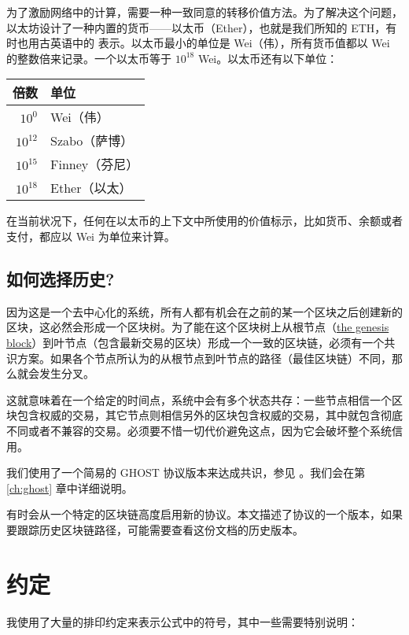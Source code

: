 \documentclass[9pt,oneside]{amsart}
\begin{document}
\begin{multicols}{2}
为了激励网络中的计算，需要一种一致同意的转移价值方法。为了解决这个问题，以太坊设计了一种内置的货币——以太币（Ether），也就是我们所知的 {\small ETH}，有时也用古英语中的 \DH{} 表示。以太币最小的单位是 Wei（伟），所有货币值都以 Wei 的整数倍来记录。一个以太币等于 $10^{18}$ Wei。以太币还有以下单位：
\par
\begin{center}
\begin{tabular}{rl}
\toprule
倍数 & 单位 \\
\midrule
$10^0$ & Wei（伟） \\
$10^{12}$ & Szabo（萨博） \\
$10^{15}$ & Finney（芬尼） \\
$10^{18}$ & Ether（以太） \\
\bottomrule
\end{tabular}
\end{center}
\par

在当前状况下，任何在以太币的上下文中所使用的价值标示，比如货币、余额或者支付，都应以 Wei 为单位来计算。

\subsection{如何选择历史?}

因为这是一个去中心化的系统，所有人都有机会在之前的某一个区块之后创建新的区块，这必然会形成一个区块树。为了能在这个区块树上从根节点（\hyperlink{Genesis_Block}{the genesis block}）到叶节点（包含最新交易的区块）形成一个一致的区块链，必须有一个共识方案。如果各个节点所认为的从根节点到叶节点的路径（最佳区块链）不同，那么就会发生分叉。

这就意味着在一个给定的时间点，系统中会有多个状态共存：一些节点相信一个区块包含权威的交易，其它节点则相信另外的区块包含权威的交易，其中就包含彻底不同或者不兼容的交易。必须要不惜一切代价避免这点，因为它会破坏整个系统信用。

我们使用了一个简易的 GHOST 协议版本来达成共识，参见 \cite{cryptoeprint:2013:881}。我们会在第 \ref{ch:ghost} 章中详细说明。

有时会从一个特定的区块链高度启用新的协议。本文描述了协议的一个版本，如果要跟踪历史区块链路径，可能需要查看这份文档的历史版本。

\section{约定}\label{ch:conventions}

我使用了大量的排印约定来表示公式中的符号，其中一些需要特别说明：


\end{multicols}
\end{document}
